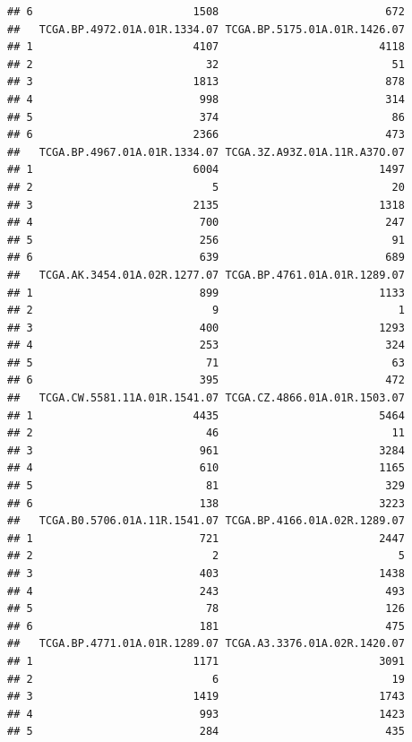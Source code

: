 \documentclass[
]{article}
\begin{document}
\begin{verbatim}
## 6                         1508                          672
##   TCGA.BP.4972.01A.01R.1334.07 TCGA.BP.5175.01A.01R.1426.07
## 1                         4107                         4118
## 2                           32                           51
## 3                         1813                          878
## 4                          998                          314
## 5                          374                           86
## 6                         2366                          473
##   TCGA.BP.4967.01A.01R.1334.07 TCGA.3Z.A93Z.01A.11R.A37O.07
## 1                         6004                         1497
## 2                            5                           20
## 3                         2135                         1318
## 4                          700                          247
## 5                          256                           91
## 6                          639                          689
##   TCGA.AK.3454.01A.02R.1277.07 TCGA.BP.4761.01A.01R.1289.07
## 1                          899                         1133
## 2                            9                            1
## 3                          400                         1293
## 4                          253                          324
## 5                           71                           63
## 6                          395                          472
##   TCGA.CW.5581.11A.01R.1541.07 TCGA.CZ.4866.01A.01R.1503.07
## 1                         4435                         5464
## 2                           46                           11
## 3                          961                         3284
## 4                          610                         1165
## 5                           81                          329
## 6                          138                         3223
##   TCGA.B0.5706.01A.11R.1541.07 TCGA.BP.4166.01A.02R.1289.07
## 1                          721                         2447
## 2                            2                            5
## 3                          403                         1438
## 4                          243                          493
## 5                           78                          126
## 6                          181                          475
##   TCGA.BP.4771.01A.01R.1289.07 TCGA.A3.3376.01A.02R.1420.07
## 1                         1171                         3091
## 2                            6                           19
## 3                         1419                         1743
## 4                          993                         1423
## 5                          284                          435

\end{verbatim}
\end{document}
